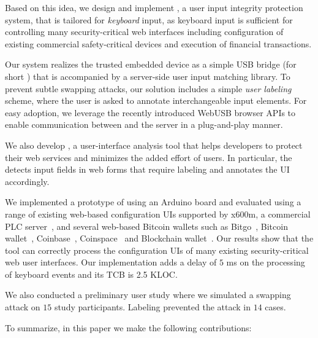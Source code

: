  Based on this idea, we design and implement \name, a user input integrity protection system, that is tailored for \emph{keyboard} input, as keyboard input is sufficient for controlling many security-critical web interfaces including configuration of existing commercial safety-critical devices and execution of financial transactions.

Our system realizes the trusted embedded device as a simple USB bridge (for short \device) that is accompanied by a server-side user input matching library. To prevent subtle swapping attacks, our solution includes a simple \emph{user labeling} scheme, where the user is asked to annotate interchangeable input elements. For easy adoption, we leverage the recently introduced WebUSB browser APIs to enable communication between \device and the server in a plug-and-play manner. 

We also develop \tool, a user-interface analysis tool that helps developers to protect their web services and minimizes the added effort of users. In particular, the \tool detects input fields in web forms that require labeling and annotates the UI accordingly. 

We implemented a prototype of \device using an Arduino board and evaluated \tool using a range of existing web-based configuration UIs supported by x600m, a commercial PLC server~\cite{controlbyweb}, and several web-based Bitcoin wallets such as Bitgo~\cite{bitgo}, Bitcoin wallet~\cite{bitcoinwallet}, Coinbase~\cite{coinbase}, Coinspace~\cite{coin} and Blockchain wallet~\cite{blockchain}. Our results show that the tool can correctly process the configuration UIs of many existing security-critical web user interfaces. Our \device implementation adds a delay of $5$ ms on the processing of keyboard events and its TCB is 2.5 KLOC. 

We also conducted a preliminary user study where we simulated a swapping attack on $15$ study participants. Labeling prevented the attack in $14$ cases.


 To summarize, in this paper we make the following contributions:

